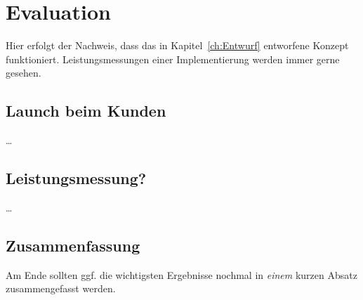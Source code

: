 
\chapter{Evaluation}
\label{ch:Evaluierung}
Hier erfolgt der Nachweis, dass das in Kapitel~\ref{ch:Entwurf}
entworfene Konzept funktioniert. 
Leistungsmessungen einer Implementierung werden immer gerne gesehen.

\section{Launch beim Kunden}
\label{ch:Evaluierung:sec:Abschnitt1}

\ldots

\section{Leistungsmessung?}
\label{ch:Evaluierung:sec:Abschnitt2}

\ldots

\section{Zusammenfassung}
\label{ch:Evaluierung:sec:zusammenfassung}

Am Ende sollten ggf. die wichtigsten Ergebnisse nochmal in \emph{einem} kurzen Absatz zusammengefasst werden.

